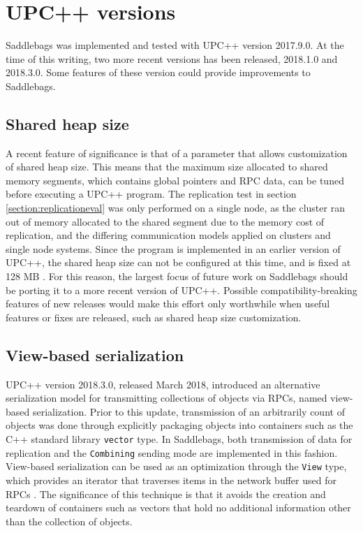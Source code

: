 \documentclass{uit-report}
\begin{document}


\section{UPC++ versions}
Saddlebags was implemented and tested with UPC++ version 2017.9.0. At the time of this writing, two more recent versions has been released, 2018.1.0 and 2018.3.0. Some features of these version could provide improvements to Saddlebags.

\subsection{Shared heap size}
A recent feature of significance is that of a parameter that allows customization of shared heap size. This means that the maximum size allocated to shared memory segments, which contains global pointers and RPC data, can be tuned before executing a UPC++ program. The replication test in section \ref{section:replicationeval} was only performed on a single node, as the cluster ran out of memory allocated to the shared segment due to the memory cost of replication, and the differing communication models applied on clusters and single node systems. Since the program is implemented in an earlier version of UPC++, the shared heap size can not be configured at this time, and is fixed at 128 MB \cite{upcxxguide20183}. For this reason, the largest focus of future work on Saddlebags should be porting it to a more recent version of UPC++. Possible compatibility-breaking features of new releases would make this effort only worthwhile when useful features or fixes are released, such as shared heap size customization.


\subsection{View-based serialization}
UPC++ version 2018.3.0, released March 2018, introduced an alternative serialization model for transmitting collections of objects via RPCs, named view-based serialization. Prior to this update, transmission of an arbitrarily count of objects was done through explicitly packaging objects into containers such as the C++ standard library \texttt{vector} type. In Saddlebags, both transmission of data for replication and the \texttt{Combining} sending mode are implemented in this fashion. View-based serialization can be used as an optimization through the \texttt{View} type, which provides an iterator that traverses items in the network buffer used for RPCs \cite{upcxxguide20183}. The significance of this technique is that it avoids the creation and teardown of containers such as vectors that hold no additional information other than the collection of objects.
\end{document}

